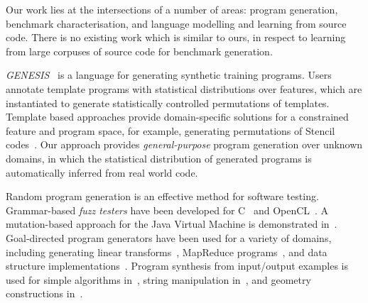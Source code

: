 %
%
%
%
%
%




Our work lies at the intersections of a number of areas: program generation, benchmark characterisation, and language modelling and learning from source code. There is no existing work which is similar to ours, in respect to learning from large corpuses of source code for benchmark generation.

\emph{GENESIS}~\cite{Chiu2015} is a language for generating synthetic training programs. Users annotate template programs with statistical distributions over features, which are instantiated to generate statistically controlled permutations of templates. Template based approaches provide domain-specific solutions for a constrained feature and program space, for example, generating permutations of Stencil codes~\cite{Garvey2015b,Cummins2015a}. Our approach provides \emph{general-purpose} program generation over unknown domains, in which the statistical distribution of generated programs is automatically inferred from real world code.

Random program generation is an effective method for software testing. Grammar-based \emph{fuzz testers} have been developed for C~\cite{Yang2012} and OpenCL~\cite{Lidbury2015a}. A mutation-based approach for the Java Virtual Machine is demonstrated in~\cite{Chena}. Goal-directed program generators have been used for a variety of domains, including generating linear transforms~\cite{Voronenko2009}, MapReduce programs~\cite{Smith}, and data structure implementations~\cite{Loncaric2016}. Program synthesis from input/output examples is used for simple algorithms in~\cite{Zaremba2015a}, string manipulation in~\cite{Gulwani2011}, and geometry constructions in~\cite{Gulwani2012}.

